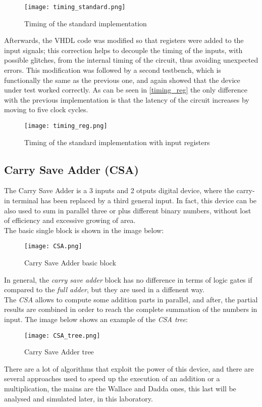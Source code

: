 \begin{figure}[h]
	\center
	\texttt{[image: timing\_standard.png]}
	\caption{Timing of the standard implementation}
	\label{fig:timing_standard}
\end{figure}

Afterwards, the VHDL code was modified so that registers were added to the input signals; this correction helps to decouple the timing of the inputs, with possible glitches, from the internal timing of the circuit, thus avoiding unexpected errors.
This modification was followed by a second testbench, which is functionally the same as the previous one, and again showed that the device under test worked correctly. As can be seen in \autoref{timing_reg} the only difference with the previous implementation is that the latency of the circuit increases by moving to five clock cycles.

\begin{figure}[h]
	\center
	\texttt{[image: timing\_reg.png]}
	\caption{Timing of the standard implementation with input registers}
	\label{fig:timing_reg}
\end{figure}



\subsection{Carry Save Adder (CSA)}
The Carry Save Adder is a 3 inputs and 2 otputs digital device, where the carry-in terminal has been replaced by a third general input. In fact, this device can be also used to sum in parallel three or plus different binary numbers, without lost of efficiency and excessive growing of area. \\
The basic single block is shown in the image below:

\begin{figure}[H]
	\center
	\texttt{[image: CSA.png]}
	\caption{Carry Save Adder basic block}
	\label{fig:CSA}
\end{figure}

In general, the \textit{carry save adder} block has no difference in terms of logic gates if compared to the \textit{full adder}, but they are used in a diffenent way. \\
The \textit{CSA} allows to compute some addition parts in parallel, and after, the partial results are combined in order to reach the complete summation of the numbers in input. The image below shows an example of the \textit{CSA tree}:
\begin{figure}[H]
	\center
	\texttt{[image: CSA\_tree.png]}
	\caption{Carry Save Adder tree}
	\label{fig:CSA_tree}
\end{figure}
There are a lot of algorithms that exploit the power of this device, and there are several approaches used to speed up the execution of an addition or a multiplication, the mains are the Wallace and Dadda ones, this last will be analysed and simulated later, in this laboratory.
